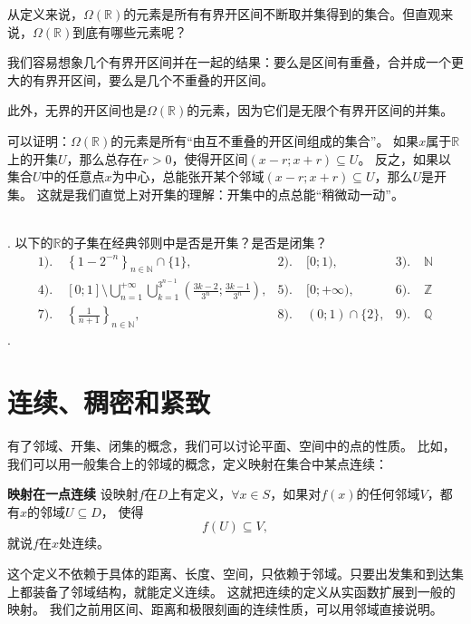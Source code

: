 \documentclass[12pt,UTF8,fontset=none]{ctexbook}
\begin{document}
从定义来说，$\Omega(\mathbb{R})$的元素是所有有界开区间不断取并集得到的集合。但直观来说，$\Omega(\mathbb{R})$到底有哪些元素呢？

我们容易想象几个有界开区间并在一起的结果：要么是区间有重叠，合并成一个更大的有界开区间，要么是几个不重叠的开区间。

此外，无界的开区间也是$\Omega(\mathbb{R})$的元素，因为它们是无限个有界开区间的并集。

可以证明：$\Omega(\mathbb{R})$的元素是所有“由互不重叠的开区间组成的集合”。
如果$x$属于$\mathbb{R}$上的开集$U$，那么总存在$r>0$，使得开区间$(x-r;x+r)\subseteq U$。
反之，如果以集合$U$中的任意点$x$为中心，总能张开某个邻域$(x-r;x+r)\subseteq U$，那么$U$是开集。
这就是我们直觉上对开集的理解：开集中的点总能“稍微动一动”。

\begin{sk}
    \mbox{} \\
    . 以下的$\mathbb{R}$的子集在经典邻则中是否是开集？是否是闭集？\\
    \begin{align*}
        1).& \;\left\{1 - 2^{-n}\right\}_{n\in\mathbb{N}}\cap\{1\},  &2).& \;[0;1),  &3).& \;\mathbb{N} \\
        4).& \; [0;1]\setminus \bigcup_{n=1}^{+\infty} \bigcup_{k=1}^{3^{n-1}} \left(\frac{3k - 2}{3^n};\frac{3k - 1}{3^n}\right),  &5).& \;[0;+\infty), &6).& \;\mathbb{Z} \\
        7).& \;\left\{\frac{1}{n+1}\right\}_{n\in\mathbb{N}},  &8).& \;(0;1)\cap\{2\}, &9).& \; \mathbb{Q}
    \end{align*}
    . 
\end{sk}

\section{连续、稠密和紧致}

有了邻域、开集、闭集的概念，我们可以讨论平面、空间中的点的性质。
比如，我们可以用一般集合上的邻域的概念，定义映射在集合中某点连续：
\begin{df}{\textbf{映射在一点连续}}
    设映射$f$在$D$上有定义，$\forall x\in S$，如果对$f(x)$的任何邻域$V$，都有$x$的邻域$U\subseteq D$，
    使得
    $$ f(U) \subseteq V,$$
    就说$f$在$x$处连续。
\end{df}
这个定义不依赖于具体的距离、长度、空间，只依赖于邻域。只要出发集和到达集上都装备了邻域结构，就能定义连续。
这就把连续的定义从实函数扩展到一般的映射。
我们之前用区间、距离和极限刻画的连续性质，可以用邻域直接说明。
\end{document}
